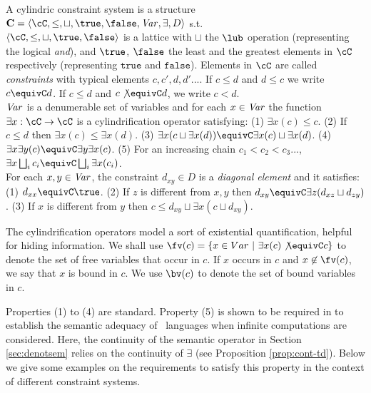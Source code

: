 \documentclass{tlp}
\begin{document}
\begin{definition} \label{def:cs}
A cylindric constraint system  is a structure 
 $
{\bf C} = \langle \cC,\leq,\sqcup,\true,\false,{\it Var}, \exists,
D \rangle
$ s.t. 
\\\noindent{-}
 $\langle \cC,\leq,\sqcup,\true,\false \rangle$ is a lattice
with $\sqcup$ the $\lub$ operation (representing the logical
\emph{and}), and $\true$, $\false$ the least and the greatest
elements in $\cC$ respectively (representing $\texttt{true}$ and
$\texttt{false}$). Elements in $\cC$ are called \emph{constraints}
with typical elements $c,c',d,d'...$. If $c\leq d$ and $d\leq c$ we write $c \equivC d$. If $c\leq d$ and $c\not\equivC d$, we write $c<d$. 
\\\noindent{-}${\it Var}$ is a denumerable set of variables and for each
$x\in {\it Var}$ the function $\exists x: \cC \to \cC$ is a
cylindrification operator satisfying:
		    (1) $\exists x (c) \leq c$. 
		(2) If $c\leq d$ then $\exists x (c) \leq \exists x (d)$.
		(3) $\exists x(c \sqcup \exists x (d)) \equivC \exists x(c) \sqcup \exists x(d)$.
		(4) $\exists x\exists y(c) \equivC \exists y\exists x (c)$.
		(5) For an increasing chain $c_1 < c_2 < c_3...$, $ \exists x
\bigsqcup_i c_i \equivC \bigsqcup_i \exists x ( c_i) $.
\\\noindent{-} For each $x,y \in {\it Var}$, the constraint $d_{xy} \in D$ is a
\emph{diagonal element} and it satisfies:
			(1) $d_{xx} \equivC \true$.
		(2) If $z$ is different from $x,y$ then $d_{xy} \equivC \exists z(d_{xz}
\sqcup d_{zy})$.
		(3) If $x$ is different from $y$ then $c \leq d_{xy} \sqcup
\exists x(c\sqcup d_{xy})$.
\end{definition}
The cylindrification operators model a sort of existential
quantification, helpful for hiding information. 
We shall use $\fv(c)=\{ x\in Var \ |  \ \exists x(c) \not\equivC c \}$ to denote the set of free variables that occur in $c$. If $x$ occurs in $c$  and $x\not\in\fv(c)$, we say that $x$ is bound in $c$. We use $\bv(c)$ to denote the set of bound variables in $c$. 


 Properties (1) to (4) are standard. Property (5) is shown to be required in \cite{BoerPP95} to establish the semantic adequacy of  \ccp\ languages when infinite computations are considered. Here,   the   continuity of the semantic operator 
 in Section \ref{sec:denotsem} relies on the continuity of $\exists$ (see Proposition \ref{prop:cont-td}). Below we give some examples on the requirements to satisfy this property in the context of different constraint systems. 
 
\end{document}
